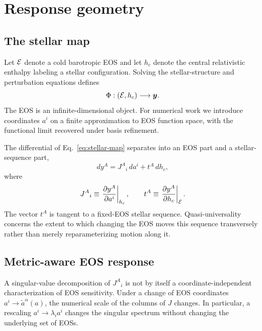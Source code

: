 \section{Response geometry}
\label{sec:geometry}

\subsection{The stellar map}

Let \(\mathcal{E}\) denote a cold barotropic EOS and let \(h_c\) denote the central relativistic enthalpy labeling a stellar configuration. Solving the stellar-structure and perturbation equations defines
\begin{equation}
    \Phi:(\mathcal{E},h_c)\longrightarrow \bm{y} .
    \label{eq:stellar-map}
\end{equation}
The EOS is an infinite-dimensional object. For numerical work we introduce coordinates \(a^i\) on a finite approximation to EOS function space, with the functional limit recovered under basis refinement.

The differential of Eq.~\eqref{eq:stellar-map} separates into an EOS part and a stellar-sequence part,
\begin{equation}
    d y^A
    =
    J^A{}_i\, da^i
    +
    t^A\, dh_c ,
    \label{eq:differential-map}
\end{equation}
where
\begin{equation}
    J^A{}_i
    \equiv
    \left.\frac{\partial y^A}{\partial a^i}\right|_{h_c},
    \qquad
    t^A
    \equiv
    \left.\frac{\partial y^A}{\partial h_c}\right|_{\mathcal{E}}.
    \label{eq:J-t-defs}
\end{equation}
The vector \(t^A\) is tangent to a fixed-EOS stellar sequence. Quasi-universality concerns the extent to which changing the EOS moves this sequence transversely rather than merely reparameterizing motion along it.

\subsection{Metric-aware EOS response}

A singular-value decomposition of \(J^A{}_i\) is not by itself a coordinate-independent characterization of EOS sensitivity. Under a change of EOS coordinates \(a^i\rightarrow\tilde a^\alpha(a)\), the numerical scale of the columns of \(J\) changes. In particular, a rescaling \(a^i\rightarrow\lambda_i a^i\) changes the singular spectrum without changing the underlying set of EOSs.

